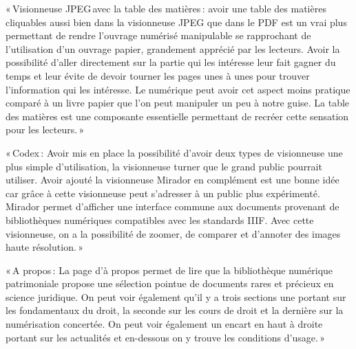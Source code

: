 « Visionneuse JPEG avec la table des matières : avoir une table des matières cliquables aussi bien dans la visionneuse JPEG que dans le PDF est un vrai plus permettant de rendre l’ouvrage numérisé manipulable se rapprochant de l’utilisation d’un ouvrage papier, grandement apprécié par les lecteurs. Avoir la possibilité d’aller directement sur la partie qui les intéresse leur fait gagner du temps et leur évite de devoir tourner les pages unes à unes pour trouver l’information qui les intéresse. Le numérique peut avoir cet aspect moins pratique comparé à un livre papier que l’on peut manipuler un peu à notre guise. La table des matières est une composante essentielle permettant de recréer cette sensation pour les lecteurs. » 

« Codex : Avoir mis en place la possibilité d’avoir deux types de visionneuse une plus simple d’utilisation, la visionneuse turner que le grand public pourrait utiliser. Avoir ajouté la visionneuse Mirador en complément est une bonne idée car grâce à cette visionneuse peut s’adresser à un public plus expérimenté. Mirador permet d’afficher une interface commune aux documents provenant de bibliothèques numériques compatibles avec les standards IIIF. Avec cette visionneuse, on a la possibilité de zoomer, de comparer et d’annoter des images haute résolution. »  

« A propos : La page d’à propos permet de lire que la bibliothèque numérique patrimoniale propose une sélection pointue de documents rares et précieux en science juridique. On peut voir également qu’il y a trois sections une portant sur les fondamentaux du droit, la seconde sur les cours de droit et la dernière sur la numérisation concertée. On peut voir également un encart en haut à droite portant sur les actualités et en-dessous on y trouve les conditions d’usage. »  

